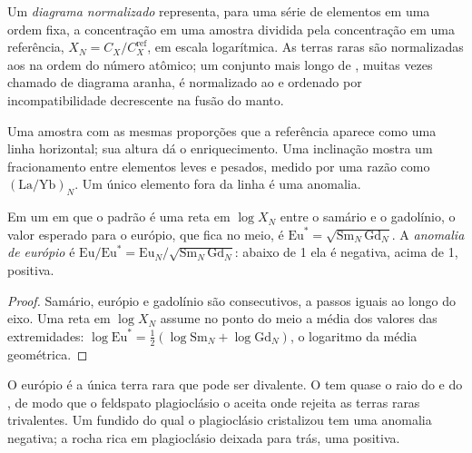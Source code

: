 \begin{definition}\label{def:b2:elements-in-the-earth:normalised}
Um \emph{diagrama normalizado} representa, para uma série de
elementos em uma ordem fixa, a concentração em uma amostra dividida pela concentração em uma
referência, $X_N = C_X/C_X^{\mathrm{ref}}$, em escala logarítmica. As terras raras
são normalizadas aos  na ordem do número atômico; um conjunto mais longo de
, muitas vezes chamado de diagrama aranha, é normalizado ao
 e ordenado por incompatibilidade decrescente na fusão do manto.
\end{definition}

Uma amostra com as mesmas proporções que a referência aparece como uma linha horizontal;
sua altura dá o enriquecimento. Uma inclinação mostra um fracionamento entre elementos leves e
pesados, medido por uma razão como $(\mathrm{La}/\mathrm{Yb})_N$. Um
único elemento fora da linha é uma anomalia.

\begin{proposition}\label{prop:b2:elements-in-the-earth:normalised}
Em um  em que o padrão é uma reta em
$\log X_N$ entre o samário e o gadolínio, o valor esperado para o európio, que
fica no meio, é $\mathrm{Eu}^* = \sqrt{\mathrm{Sm}_N\,\mathrm{Gd}_N}$. A
\emph{anomalia de európio} é
$\mathrm{Eu}/\mathrm{Eu}^* = \mathrm{Eu}_N/\sqrt{\mathrm{Sm}_N\,\mathrm{Gd}_N}$:
abaixo de 1 ela é negativa, acima de 1, positiva.
\end{proposition}

\begin{proof}
Samário, európio e gadolínio são consecutivos, a passos iguais ao longo do eixo.
Uma reta em $\log X_N$ assume no ponto do meio a média dos valores das extremidades:
$\log \mathrm{Eu}^* = \tfrac12(\log \mathrm{Sm}_N + \log \mathrm{Gd}_N)$, o
logaritmo da média geométrica.
\end{proof}

O európio é a única terra rara que pode ser divalente. O  tem quase o
raio do  e do , de modo que o feldspato plagioclásio o aceita onde
rejeita as terras raras trivalentes. Um fundido do qual o plagioclásio cristalizou
tem uma anomalia negativa; a rocha rica em plagioclásio deixada para trás, uma positiva.

